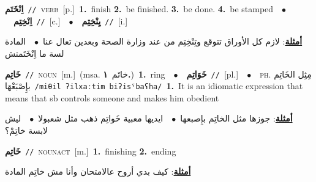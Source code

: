 \documentclass[10pt,a4paper,twoside]{article} %
\begin{document}
\begin{multicols}{2}
{\setlength\topsep{0pt}\textbf{\foreignlanguage{arabic}{اِنْخَتَم}}\ {\color{gray}\texttt{//}\color{black}}\ \textsc{verb}\ [p.]\ \textbf{1.}~finish  \textbf{2.}~be finished.  \textbf{3.}~be done.  \textbf{4.}~be stamped\ \ $\bullet$\ \ \setlength\topsep{0pt}\textbf{\foreignlanguage{arabic}{اِنْخِتِم}}\ {\color{gray}\texttt{//}\color{black}}\ [c.]\ \ $\bullet$\ \ \setlength\topsep{0pt}\textbf{\foreignlanguage{arabic}{يِنْخِتِم}}\ {\color{gray}\texttt{//}\color{black}}\ [i.]\  \begin{flushright}\color{gray}\foreignlanguage{arabic}{\textbf{\underline{\foreignlanguage{arabic}{أمثلة}}}: لازم كل الأوراق تتوقع وتِنْخِتِم من عند وزارة الصحة وبعدين تعال عنا\ $\bullet$\ \  المادة لسة ما اِنْخَتَمتش}\end{flushright}\color{black}} \vspace{2mm}

{\setlength\topsep{0pt}\textbf{\foreignlanguage{arabic}{خَاتِم}}\ {\color{gray}\texttt{//}\color{black}}\ \textsc{noun}\ [m.]\ \color{gray}(msa. \foreignlanguage{arabic}{خاتَم}~\foreignlanguage{arabic}{\textbf{١.}})\color{black}\ \textbf{1.}~ring\ \ $\bullet$\ \ \setlength\topsep{0pt}\textbf{\foreignlanguage{arabic}{خَوَاتِم}}\ {\color{gray}\texttt{//}\color{black}}\ [pl.]\ \ $\bullet$\ \ \textsc{ph.} \color{gray} \foreignlanguage{arabic}{مِثِل الخَاتِم بإِصْبَعْهَا}\color{black}\ {\color{gray}\texttt{/{\sffamily miθil ʔilxaːtim biʔisˤbaʕha}/}\color{black}}\ \textbf{1.}~It is an idiomatic expression that means that sb controls someone and makes him obedient\  \begin{flushright}\color{gray}\foreignlanguage{arabic}{\textbf{\underline{\foreignlanguage{arabic}{أمثلة}}}: جوزها مثل الخاتِم بإِصبعها\ $\bullet$\ \  ايديها معبية خَواتِم ذهب مثل شعبولا\ $\bullet$\ \  ليش لابسة خاتِمْ؟}\end{flushright}\color{black}} \vspace{2mm}

{\setlength\topsep{0pt}\textbf{\foreignlanguage{arabic}{خَاتِم}}\ {\color{gray}\texttt{//}\color{black}}\ \textsc{noun\textunderscore act}\ [m.]\ \textbf{1.}~finishing  \textbf{2.}~ending\  \begin{flushright}\color{gray}\foreignlanguage{arabic}{\textbf{\underline{\foreignlanguage{arabic}{أمثلة}}}: كيف بدي أروح عالامتحان وأنا مش خاتِم المادة}\end{flushright}\color{black}} \vspace{2mm}


\end{multicols}
\end{document}
